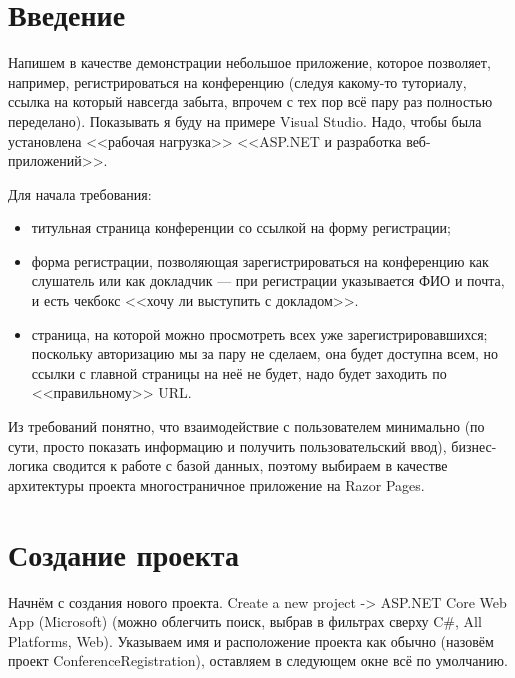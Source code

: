\documentclass{../../text-style}
\begin{document}
\maketitle
\thispagestyle{empty}

\section{Введение}

Напишем в качестве демонстрации небольшое приложение, которое позволяет, например, регистрироваться на конференцию (следуя какому-то туториалу, ссылка на который навсегда забыта, впрочем с тех пор всё пару раз полностью переделано). Показывать я буду на примере Visual Studio. Надо, чтобы была установлена <<рабочая нагрузка>> <<ASP.NET и разработка веб-приложений>>.

Для начала требования:

\begin{itemize}
    \item титульная страница конференции со ссылкой на форму регистрации;
    \item форма регистрации, позволяющая зарегистрироваться на конференцию как слушатель или как докладчик --- при регистрации указывается ФИО и почта, и есть чекбокс <<хочу ли выступить с докладом>>.
    \item страница, на которой можно просмотреть всех уже зарегистрировавшихся; поскольку авторизацию мы за пару не сделаем, она будет доступна всем, но ссылки с главной страницы на неё не будет, надо будет заходить по <<правильному>> URL.
\end{itemize}

Из требований понятно, что взаимодействие с пользователем минимально (по сути, просто показать информацию и получить пользовательский ввод), бизнес-логика сводится к работе с базой данных, поэтому выбираем в качестве архитектуры проекта многостраничное приложение на Razor Pages.

\section{Создание проекта}

Начнём с создания нового проекта. Create a new project -> ASP.NET Core Web App (Microsoft) (можно облегчить поиск, выбрав в фильтрах сверху C\#, All Platforms, Web). Указываем имя и расположение проекта как обычно (назовём проект ConferenceRegistration), оставляем в следующем окне всё по умолчанию.
\end{document}
